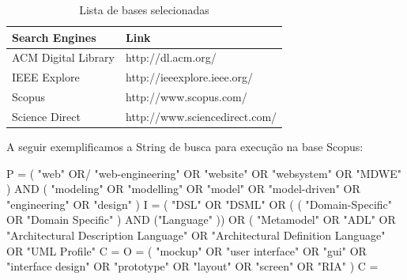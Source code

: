 
\begin{table}[t!]
\small
\caption{Lista de bases selecionadas}
\begin{center}
    \begin{tabular}{ | p{3.7cm} | p{4cm} | }
    \hline
		\textbf{Search Engines} & \textbf{Link} \\ \hline

ACM Digital Library & http://dl.acm.org/ \\ \hline
IEEE Explore & http://ieeexplore.ieee.org/ \\ \hline
Scopus & http://www.scopus.com/ \\ \hline
Science Direct & http://www.sciencedirect.com/ \\ \hline
\end{tabular}
\end{center}
\label{tab:databases}
\end{table}

A seguir exemplificamos a String de busca para execução na base Scopus:


P = ( "web"  OR/  "web-engineering"  OR  "website"  OR  "websystem"  OR  "MDWE" ) AND  ( "modeling"  OR  "modelling"  OR  "model"  OR  "model-driven"  OR  "engineering"  OR  "design" )
I =  ( "DSL"  OR  "DSML"  OR  ( ( "Domain-Specific"  OR  "Domain Specific" ) AND  ("Language" ))  OR  ( "Metamodel"  OR  "ADL"  OR  "Architectural Description Language"  OR  "Architectural Definition Language"  OR  "UML Profile" 
C = 
O = ( "mockup"  OR  "user interface"  OR  "gui"  OR  "interface design"  OR  "prototype"  OR  "layout"  OR  "screen"  OR  "RIA" )
C = 


